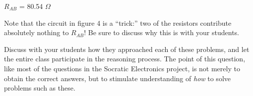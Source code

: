 $R_{AB}$ = 80.54 $\Omega$







Note that the circuit in figure 4 is a ``trick:'' two of the resistors contribute absolutely nothing to $R_{AB}$!  Be sure to discuss why this is with your students.

Discuss with your students how they approached each of these problems, and let the entire class participate in the reasoning process.  The point of this question, like most of the questions in the Socratic Electronics project, is not merely to obtain the correct answers, but to stimulate understanding of {\it how} to solve problems such as these.




